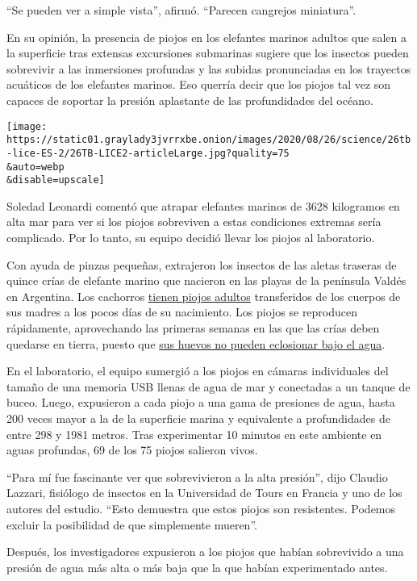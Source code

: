 ``Se pueden ver a simple vista'', afirmó. ``Parecen cangrejos
miniatura''.

En su opinión, la presencia de piojos en los elefantes marinos adultos
que salen a la superficie tras extensas excursiones submarinas sugiere
que los insectos pueden sobrevivir a las inmersiones profundas y las
subidas pronunciadas en los trayectos acuáticos de los elefantes
marinos. Eso querría decir que los piojos tal vez son capaces de
soportar la presión aplastante de las profundidades del océano.

\texttt{[image: https://static01.graylady3jvrrxbe.onion/images/2020/08/26/science/26tb-lice-ES-2/26TB-LICE2-articleLarge.jpg?quality=75\\\&auto=webp\\\&disable=upscale]}

Soledad Leonardi comentó que atrapar elefantes marinos de 3628
kilogramos en alta mar para ver si los piojos sobreviven a estas
condiciones extremas sería complicado. Por lo tanto, su equipo decidió
llevar los piojos al laboratorio.

Con ayuda de pinzas pequeñas, extrajeron los insectos de las aletas
traseras de quince crías de elefante marino que nacieron en las playas
de la península Valdés en Argentina. Los cachorros
\href{https://www.publish.csiro.au/zo/ZO9650437}{tienen piojos adultos}
transferidos de los cuerpos de sus madres a los pocos días de su
nacimiento. Los piojos se reproducen rápidamente, aprovechando las
primeras semanas en las que las crías deben quedarse en tierra, puesto
que \href{https://www.publish.csiro.au/zo/ZO9650437}{sus huevos no
pueden eclosionar bajo el agua}.

En el laboratorio, el equipo sumergió a los piojos en cámaras
individuales del tamaño de una memoria USB llenas de agua de mar y
conectadas a un tanque de buceo. Luego, expusieron a cada piojo a una
gama de presiones de agua, hasta 200 veces mayor a la de la superficie
marina y equivalente a profundidades de entre 298 y 1981 metros. Tras
experimentar 10 minutos en este ambiente en aguas profundas, 69 de los
75 piojos salieron vivos.

``Para mí fue fascinante ver que sobrevivieron a la alta presión'', dijo
Claudio Lazzari, fisiólogo de insectos en la Universidad de Tours en
Francia y uno de los autores del estudio. ``Esto demuestra que estos
piojos son resistentes. Podemos excluir la posibilidad de que
simplemente mueren''.

Después, los investigadores expusieron a los piojos que habían
sobrevivido a una presión de agua más alta o más baja que la que habían
experimentado antes.

